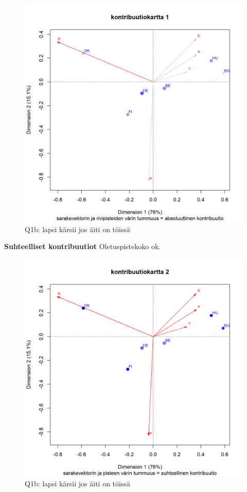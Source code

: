 \documentclass[
  finnish,
]{book}
\begin{document}
\begin{figure}

{\centering \includegraphics[width=0.9\linewidth]{JH_capaper_files/figure-latex/G1-3asymmContrib1-1} 

}

\caption{Q1b: lapsi kärsii jos äiti on töissä}\label{fig:G1-3asymmContrib1}
\end{figure}

\textbf{Suhteelliset kontribuutiot} Oletuspistekoko ok.

\begin{figure}

{\centering \includegraphics[width=0.9\linewidth]{JH_capaper_files/figure-latex/G1-3asymmContrib2-1} 

}

\caption{Q1b: lapsi kärsii jos äiti on töissä}\label{fig:G1-3asymmContrib2}
\end{figure}
\end{document}
